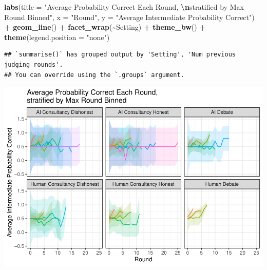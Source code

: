 \documentclass[
]{article}
\newenvironment{Shaded}{\begin{snugshade}}{\end{snugshade}}
\newcommand{\AttributeTok}[1]{\textcolor[rgb]{0.13,0.29,0.53}{#1}}
\newcommand{\FunctionTok}[1]{\textcolor[rgb]{0.13,0.29,0.53}{\textbf{#1}}}
\newcommand{\NormalTok}[1]{#1}
\newcommand{\SpecialCharTok}[1]{\textcolor[rgb]{0.81,0.36,0.00}{\textbf{#1}}}
\newcommand{\StringTok}[1]{\textcolor[rgb]{0.31,0.60,0.02}{#1}}
\begin{document}
\begin{Shaded}
\begin{Highlighting}[]
  \FunctionTok{labs}\NormalTok{(}\AttributeTok{title =} \StringTok{"Average Probability Correct Each Round, }\SpecialCharTok{\textbackslash{}n}\StringTok{stratified by Max Round Binned"}\NormalTok{,}
       \AttributeTok{x =} \StringTok{"Round"}\NormalTok{, }
       \AttributeTok{y =} \StringTok{"Average Intermediate Probability Correct"}\NormalTok{) }\SpecialCharTok{+}
  \FunctionTok{geom\_line}\NormalTok{() }\SpecialCharTok{+}
  \FunctionTok{facet\_wrap}\NormalTok{(}\SpecialCharTok{\textasciitilde{}}\NormalTok{Setting) }\SpecialCharTok{+}
  \FunctionTok{theme\_bw}\NormalTok{() }\SpecialCharTok{+}
  \FunctionTok{theme}\NormalTok{(}\AttributeTok{legend.position =} \StringTok{"none"}\NormalTok{)}
\end{Highlighting}
\end{Shaded}

\begin{verbatim}
## `summarise()` has grouped output by 'Setting', 'Num previous judging rounds'.
## You can override using the `.groups` argument.
\end{verbatim}

\includegraphics{debate-2309_files/figure-latex/strat ggplot-13.pdf}
\end{document}
